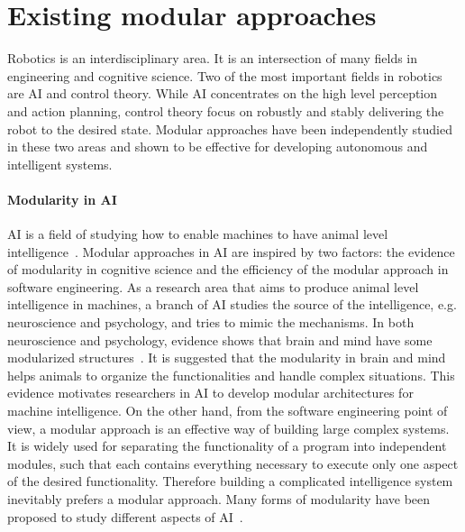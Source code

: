 \section{Existing modular approaches}
\label{cha1:modular}
Robotics is an interdisciplinary area. It is an intersection of many fields in engineering and cognitive science. Two of the most important fields in robotics are AI and control theory. While AI concentrates on the high level perception and action planning, control theory focus on robustly and stably delivering the robot to the desired state. Modular approaches have been independently studied in these two areas and shown to be effective for developing autonomous and intelligent systems.

\paragraph{Modularity in AI}
AI is a field of studying how to enable machines to have animal level intelligence~\citep{brooks1991intelligence}. Modular approaches in AI are inspired by two factors: the evidence of modularity in cognitive science and the efficiency of the modular approach in software engineering.
As a research area that aims to produce animal level intelligence in machines, a branch of AI studies the source of the intelligence, e.g. neuroscience and psychology, and tries to mimic the mechanisms. In both neuroscience and psychology, evidence shows that brain and mind have some modularized structures~\citep{fodor1983modularity,peretz2003modularity,barrett2006modularity,sztarker2011brain}. It is suggested that the modularity in brain and mind helps animals to organize the functionalities and handle complex situations. This evidence motivates researchers in AI to develop modular architectures for machine intelligence. On the other hand, from the software engineering point of view, a modular approach is an effective way of building large complex systems. It is widely used for separating the functionality of a program into independent modules, such that each contains everything necessary to execute only one aspect of the desired functionality. Therefore building a complicated intelligence system inevitably prefers a modular approach. Many forms of modularity have been proposed to study different aspects of AI~\citep{bryson2004modular}.


